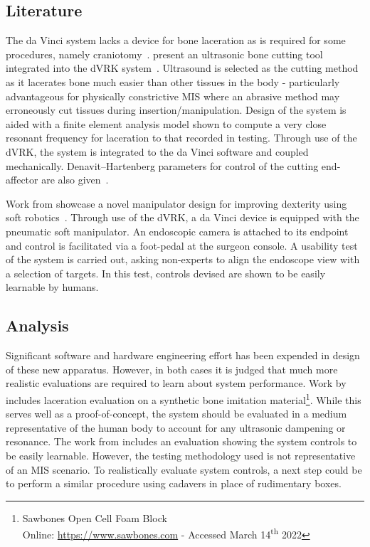 \documentclass[english]{sobraep}
\begin{document}
\subsection{Literature}
\par{The da Vinci system lacks a device for bone laceration as is required for some procedures, namely craniotomy~\cite{Fernandez-de_Thomas2022-ih}. \citeauthor{bone-cutter} present an ultrasonic bone cutting tool integrated into the dVRK system~\cite{bone-cutter}. Ultrasound is selected as the cutting method as it lacerates bone much easier than other tissues in the body - particularly advantageous for physically constrictive MIS where an abrasive method may erroneously cut tissues during insertion/manipulation. Design of the system is aided with a finite element analysis model shown to compute a very close resonant frequency for laceration to that recorded in testing. Through use of the dVRK, the system is integrated to the da Vinci software and coupled mechanically. Denavit–Hartenberg parameters for control of the cutting end-affector are also given~\cite[Table 3]{bone-cutter}.}
\par{Work from  \citeauthor{soft-manip} showcase a novel manipulator design for improving dexterity using soft robotics~\cite{soft-manip}. Through use of the dVRK, a da Vinci device is equipped with the pneumatic soft manipulator. An endoscopic camera is attached to its endpoint and control  is facilitated via a foot-pedal at the surgeon console. A usability test of the system is carried out, asking non-experts to align the endoscope view with a selection of targets. In this test, controls devised are shown to be easily learnable by humans.}
\subsection{Analysis}
\par{Significant software and hardware engineering effort has been expended in design of these new apparatus.  However, in both cases it is judged that much more realistic evaluations are required to learn about system performance. Work by \citeauthor{bone-cutter} includes laceration evaluation on a synthetic bone imitation material\footnote{Sawbones\textregistered{}  Open Cell Foam Block\\ Online: \url{https://www.sawbones.com} - Accessed March 14\textsuperscript{th} 2022}. While this serves well as a proof-of-concept, the system should be evaluated in a medium representative of the human body to account for any ultrasonic dampening or resonance. The work from \citeauthor{soft-manip} includes an evaluation showing the system controls to be easily learnable. However, the testing methodology used is not representative of an MIS scenario. To realistically evaluate system controls, a next step could be to perform a similar procedure using cadavers in place of rudimentary boxes. }
\end{document}

